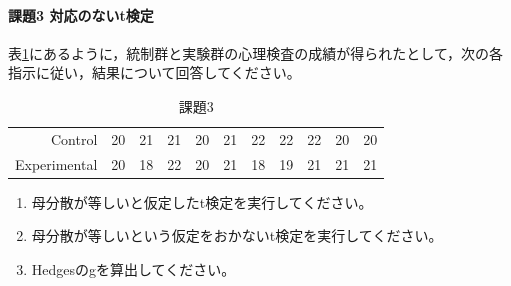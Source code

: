 \documentclass{ltjsbook}
\begin{document}
\paragraph{課題3 対応のないt検定}
表\ref{exe:20_3}にあるように，統制群と実験群の心理検査の成績が得られたとして，次の各指示に従い，結果について回答してください。
\begin{table}[ht]
	\centering
	\caption{課題3}
	\label{exe:20_3}
	\begin{tabular}{rrrrrrrrrrr}
		\hline
		Control      & 20 & 21 & 21 & 20 & 21 & 22 & 22 & 22 & 20 & 20 \\
		Experimental & 20 & 18 & 22 & 20 & 21 & 18 & 19 & 21 & 21 & 21 \\
		\hline
	\end{tabular}
\end{table}

\begin{enumerate}
	\item 母分散が等しいと仮定したt検定を実行してください。
	\item 母分散が等しいという仮定をおかないt検定を実行してください。
	\item Hedgesのgを算出してください。
\end{enumerate}
\end{document}
